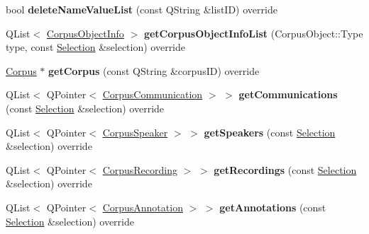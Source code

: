 \begin{DoxyCompactItemize}
bool {\bfseries delete\+Name\+Value\+List} (const Q\+String \&list\+ID) override
\item 
\mbox{\label{class_x_m_l_metadata_datastore_a2ea63d5aec3ef934e58ee03227a62824}} 
Q\+List$<$ \hyperlink{class_corpus_object_info}{Corpus\+Object\+Info} $>$ {\bfseries get\+Corpus\+Object\+Info\+List} (Corpus\+Object\+::\+Type type, const \hyperlink{class_metadata_datastore_1_1_selection}{Selection} \&selection) override
\item 
\mbox{\label{class_x_m_l_metadata_datastore_a9df1555c30923da9101414d907d9a4cf}} 
\hyperlink{class_corpus}{Corpus} $\ast$ {\bfseries get\+Corpus} (const Q\+String \&corpus\+ID) override
\item 
\mbox{\label{class_x_m_l_metadata_datastore_a953dcc2448d3b627941f2dc2299f0755}} 
Q\+List$<$ Q\+Pointer$<$ \hyperlink{class_corpus_communication}{Corpus\+Communication} $>$ $>$ {\bfseries get\+Communications} (const \hyperlink{class_metadata_datastore_1_1_selection}{Selection} \&selection) override
\item 
\mbox{\label{class_x_m_l_metadata_datastore_aca20d23ccb832f4608f2d77e31596729}} 
Q\+List$<$ Q\+Pointer$<$ \hyperlink{class_corpus_speaker}{Corpus\+Speaker} $>$ $>$ {\bfseries get\+Speakers} (const \hyperlink{class_metadata_datastore_1_1_selection}{Selection} \&selection) override
\item 
\mbox{\label{class_x_m_l_metadata_datastore_a570f859b96574bd9cefb1d25553f2d61}} 
Q\+List$<$ Q\+Pointer$<$ \hyperlink{class_corpus_recording}{Corpus\+Recording} $>$ $>$ {\bfseries get\+Recordings} (const \hyperlink{class_metadata_datastore_1_1_selection}{Selection} \&selection) override
\item 
\mbox{\label{class_x_m_l_metadata_datastore_ad8d096fdf3a062884684b465120e2aa4}} 
Q\+List$<$ Q\+Pointer$<$ \hyperlink{class_corpus_annotation}{Corpus\+Annotation} $>$ $>$ {\bfseries get\+Annotations} (const \hyperlink{class_metadata_datastore_1_1_selection}{Selection} \&selection) override
\item 
\mbox{\label{class_x_m_l_metadata_datastore_a160dde5b83c9e17b0721c41b5a049ca0}} 

\end{DoxyCompactItemize}
